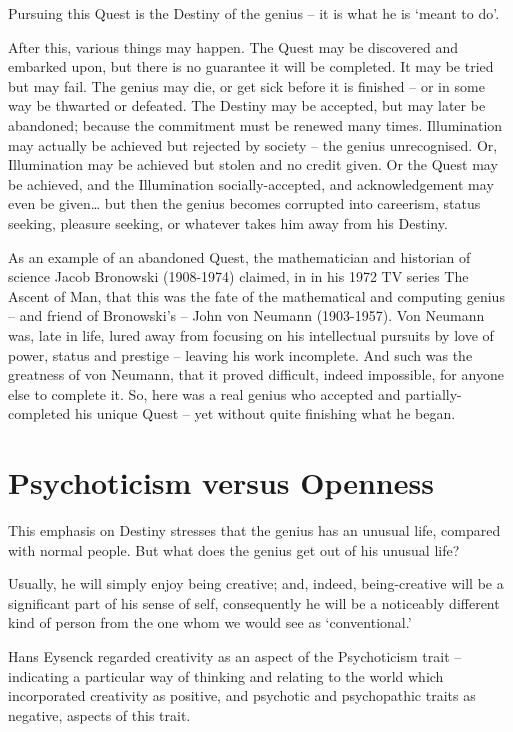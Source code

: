 \documentclass[
]{book}
\begin{document}
Pursuing this Quest is the Destiny of the genius -- it is what he is `meant to do'.

After this, various things may happen. The Quest may be discovered and embarked upon, but there is no guarantee it will be completed. It may be tried but may fail. The genius may die, or get sick before it is finished -- or in some way be thwarted or defeated. The Destiny may be accepted, but may later be abandoned; because the commitment must be renewed many times. Illumination may actually be achieved but rejected by society -- the genius unrecognised. Or, Illumination may be achieved but stolen and no credit given. Or the Quest may be achieved, and the Illumination socially-accepted, and acknowledgement may even be given\ldots{} but then the genius becomes corrupted into careerism, status seeking, pleasure seeking, or whatever takes him away from his Destiny.

As an example of an abandoned Quest, the mathematician and historian of science Jacob Bronowski (1908-1974) claimed, in in his 1972 TV series The Ascent of Man, that this was the fate of the mathematical and computing genius -- and friend of Bronowski's -- John von Neumann (1903-1957). Von Neumann was, late in life, lured away from focusing on his intellectual pursuits by love of power, status and prestige -- leaving his work incomplete. And such was the greatness of von Neumann, that it proved difficult, indeed impossible, for anyone else to complete it. So, here was a real genius who accepted and partially-completed his unique Quest -- yet without quite finishing what he began.

\hypertarget{psychoticism-versus-openness}{%
\section{Psychoticism versus Openness}\label{psychoticism-versus-openness}}

This emphasis on Destiny stresses that the genius has an unusual life, compared with normal people. But what does the genius get out of his unusual life?

Usually, he will simply enjoy being creative; and, indeed, being-creative will be a significant part of his sense of self, consequently he will be a noticeably different kind of person from the one whom we would see as `conventional.'

Hans Eysenck regarded creativity as an aspect of the Psychoticism trait -- indicating a particular way of thinking and relating to the world which incorporated creativity as positive, and psychotic and psychopathic traits as negative, aspects of this trait.
\end{document}
